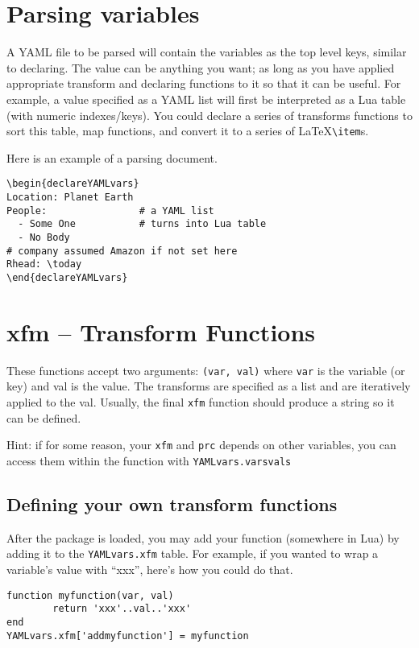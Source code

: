 \documentclass[11pt,parskip=half]{scrartcl}
\begin{document}
\section{Parsing variables}
A YAML file to be parsed will contain the variables as the top level keys, similar to declaring.
The value can be anything you want; as long as you have applied appropriate transform and declaring
functions to it so that it can be useful. For example, a value specified as a YAML list will first be
interpreted as a Lua table (with numeric indexes/keys). You could declare a series of transforms functions
to sort this table, map functions, and convert it to a series of \LaTeX  \texttt{\textbackslash item}s.

Here is an example of a parsing document.


\begin{verbatim}
\begin{declareYAMLvars}
Location: Planet Earth
People:                # a YAML list
  - Some One           # turns into Lua table
  - No Body
# company assumed Amazon if not set here
Rhead: \today
\end{declareYAMLvars}
\end{verbatim}


 \section{xfm -- Transform Functions}
These functions accept two arguments: \texttt{(var, val)} where \texttt{var} is the variable (or key) and val is the value.
The transforms are specified as a list and are iteratively applied to the val.
Usually, the final \texttt{xfm} function should produce a string so it can be defined.

Hint: if for some reason, your \texttt{xfm} and \texttt{prc} depends on other variables,
you can access them within the function
with \texttt{YAMLvars.varsvals}

\subsection{Defining your own transform functions}
After the package is loaded, you may add your function (somewhere in Lua)
by adding it to the \texttt{YAMLvars.xfm} table.
For example, if you wanted to wrap a variable's value with ``xxx'', here's how you could do that.
\begin{verbatim}
function myfunction(var, val)
        return 'xxx'..val..'xxx'
end
YAMLvars.xfm['addmyfunction'] = myfunction
\end{verbatim}
\end{document}
